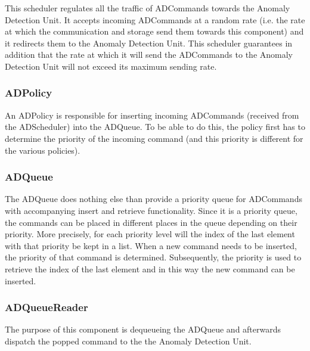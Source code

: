 \npar This scheduler regulates all the traffic of ADCommands towards the
Anomaly Detection Unit. It accepts incoming ADCommands at a random rate (i.e.
the rate at which the communication and storage send them towards this
component) and it redirects them to the Anomaly Detection Unit. This
scheduler guarantees in addition that the rate at which it will send the
ADCommands to the Anomaly Detection Unit will not exceed its maximum sending
rate.

\subsubsection{ADPolicy}

\npar An ADPolicy is responsible for inserting incoming ADCommands (received
from the ADScheduler) into the ADQueue. To be able to do this, the policy first
has to determine the priority of the incoming command (and this priority is
different for the various policies).

\subsubsection{ADQueue}

\npar The ADQueue does nothing else than provide a priority queue for
ADCommands with accompanying insert and retrieve functionality. Since
it is a priority queue, the commands can be placed in different places in the
queue depending on their priority. More precisely, for each priority level will
the index of the last element with that priority be kept in a list. When a new
command needs to be inserted, the priority of that command is determined.
Subsequently, the priority is used to retrieve the index of the last element and
in this way the new command can be inserted.

\subsubsection{ADQueueReader}

\npar The purpose of this component is dequeueing the ADQueue and
afterwards dispatch the popped command to the the Anomaly Detection Unit.

